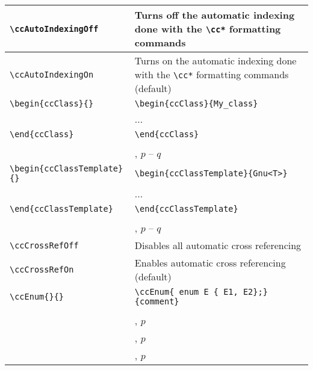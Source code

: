 \begin{supertabular}{|p{7.4cm}|p{7.4cm}|} 
\verb|\ccAutoIndexingOff| 
& Turns off the automatic indexing done with the \verb|\cc*| formatting commands
  \\ \hline

\verb|\ccAutoIndexingOn| 
& Turns on the automatic indexing done with the \verb|\cc*| formatting commands
(default)
  \\ \hline

\verb|\begin{ccClass}{|\verb|}|
                            &\verb|\begin{ccClass}{My_class}| \\
 & ... \\
\verb|\end{ccClass}|         &\verb|\end{ccClass}| \\
& \\
& , $p$ -- $q$ 
 \\ \hline

\verb|\begin{ccClassTemplate}{|\verb|}|
                            & \verb|\begin{ccClassTemplate}{Gnu<T>}| \\
 & ... \\
\verb|\end{ccClassTemplate}| & \verb|\end{ccClassTemplate}| \\
& \\
& , $p$ -- $q$
 \\ \hline

\verb|\ccCrossRefOff| 
& Disables all automatic cross referencing
  \\ \hline

\verb|\ccCrossRefOn| 
& Enables automatic cross referencing (default)
  \\ \hline

\verb|\ccEnum{|\verb|}{|\verb|}|
&\verb|\ccEnum{ enum E { E1, E2};}{comment}| \\
& \\
&, $p$ \\
&, $p$ \\
&, $p$ 
 \\ \hline


\end{supertabular}
